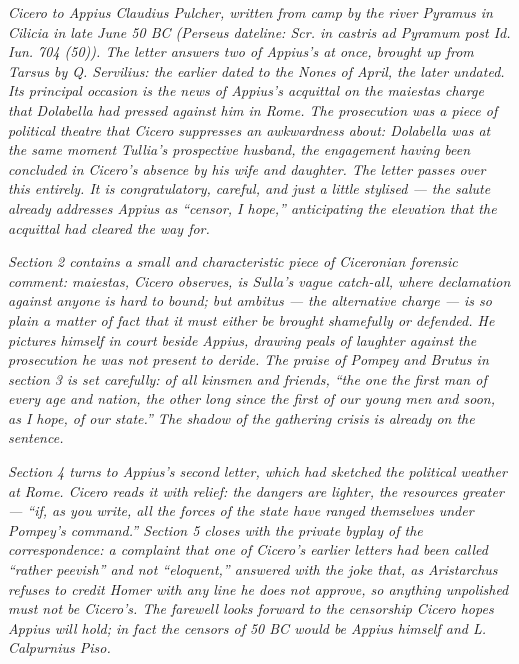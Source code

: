 
\textit{Cicero to Appius Claudius Pulcher, written from
camp by the river Pyramus in Cilicia in late June 50 BC
(Perseus dateline: \textit{Scr. in castris ad Pyramum
post Id. Iun. 704 (50)}). The letter answers two of
Appius's at once, brought up from Tarsus by Q.
Servilius: the earlier dated to the Nones of April,
the later undated. Its principal occasion is the news
of Appius's acquittal on the \textit{maiestas} charge
that Dolabella had pressed against him in Rome. The
prosecution was a piece of political theatre that
Cicero suppresses an awkwardness about: Dolabella was
at the same moment Tullia's prospective husband, the
engagement having been concluded in Cicero's absence
by his wife and daughter. The letter passes over
this entirely. It is congratulatory, careful, and just
a little stylised --- the salute already addresses
Appius as ``censor, I hope,'' anticipating the
elevation that the acquittal had cleared the way for.}

\textit{Section 2 contains a small and characteristic
piece of Ciceronian forensic comment: \textit{maiestas},
Cicero observes, is Sulla's vague catch-all, where
declamation against anyone is hard to bound; but
\textit{ambitus} --- the alternative charge --- is so
plain a matter of fact that it must either be brought
shamefully or defended. He pictures himself in court
beside Appius, drawing peals of laughter against the
prosecution he was not present to deride. The praise
of Pompey and Brutus in section 3 is set carefully: of
all kinsmen and friends, ``the one the first man of
every age and nation, the other long since the first
of our young men and soon, as I hope, of our state.''
The shadow of the gathering crisis is already on the
sentence.}

\textit{Section 4 turns to Appius's second letter,
which had sketched the political weather at Rome.
Cicero reads it with relief: the dangers are lighter,
the resources greater --- ``if, as you write, all the
forces of the state have ranged themselves under
Pompey's command.'' Section 5 closes with the
private byplay of the correspondence: a complaint
that one of Cicero's earlier letters had been called
``rather peevish'' and not ``eloquent,'' answered with
the joke that, as Aristarchus refuses to credit Homer
with any line he does not approve, so anything
unpolished must not be Cicero's. The farewell looks
forward to the censorship Cicero hopes Appius will
hold; in fact the censors of 50 BC would be Appius
himself and L. Calpurnius Piso.}
